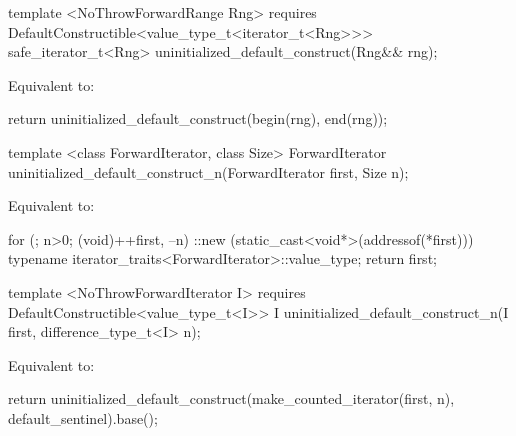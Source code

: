 
{\color{addclr}
\begin{codeblock}
template <NoThrowForwardRange Rng>
  requires
DefaultConstructible<value_type_t<iterator_t<Rng>>>
  safe_iterator_t<Rng> uninitialized_default_construct(Rng&& rng);
\end{codeblock}

\pnum
\effects Equivalent to:
\begin{codeblock}
        return uninitialized_default_construct(begin(rng), end(rng));
\end{codeblock}
} %

{\color{remclr}
\begin{codeblock}
template <class ForwardIterator, class Size>
  ForwardIterator uninitialized_default_construct_n(ForwardIterator first, Size n);
\end{codeblock}

\setcounter{Paras}{1}
\pnum
\effects Equivalent to:
\begin{codeblock}
        for (; n>0; (void)++first, --n)
          ::new (static_cast<void*>(addressof(*first)))
            typename iterator_traits<ForwardIterator>::value_type;
        return first;
\end{codeblock}
} %

{\color{addclr}

\begin{codeblock}
template <NoThrowForwardIterator I>
  requires
DefaultConstructible<value_type_t<I>>
  I uninitialized_default_construct_n(I first, difference_type_t<I> n);
\end{codeblock}

\pnum
\effects Equivalent to:
\begin{codeblock}
    return uninitialized_default_construct(make_counted_iterator(first, n),
      default_sentinel{}).base();
\end{codeblock}
} %

